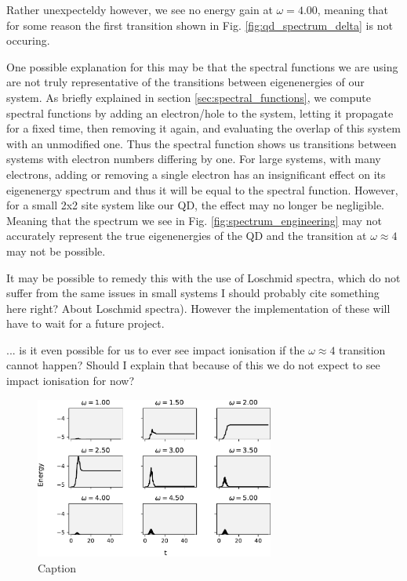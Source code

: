 \medskip

Rather unexpecteldy however, we see no energy gain at $\omega = 4.00$, meaning that for some reason the first transition shown in Fig. \ref{fig:qd_spectrum_delta} is not occuring.

\medskip

One possible explanation for this may be that the spectral functions we are using are not truly representative of the transitions between eigenenergies of our system. As briefly explained in section \ref{sec:spectral_functions}, we compute spectral functions by adding an electron/hole to the system, letting it propagate for a fixed time, then removing it again, and evaluating the overlap of this system with an unmodified one. Thus the spectral function shows us transitions between systems with electron numbers differing by one. For large systems, with many electrons, adding or removing a single electron has an insignificant effect on its eigenenergy spectrum and thus it will be equal to the spectral function. However, for a small 2x2 site system like our QD, the effect may no longer be negligible. Meaning that the spectrum we see in Fig. \ref{fig:spectrum_engineering} may not accurately represent the true eigenenergies of the QD and the transition at $\omega\approx 4$ may not be possible.

\medskip
It may be possible to remedy this with the use of Loschmid spectra, which do not suffer from the same issues in small systems{\color{red} I should probably cite something here right? About Loschmid spectra}). However the implementation of these will have to wait for a future project.

\medskip
{\color{green}... is it even possible for us to ever see impact ionisation if the $\omega \approx 4$ transition cannot happen? Should I explain that because of this we do not expect to see impact ionisation for now?} 

\begin{figure}[!hbt]
    \centering
    \includegraphics[width=0.7\textwidth]{graph/9test.pdf}
    \caption{Caption}
    \label{fig:qd_9_total_energy}
\end{figure}